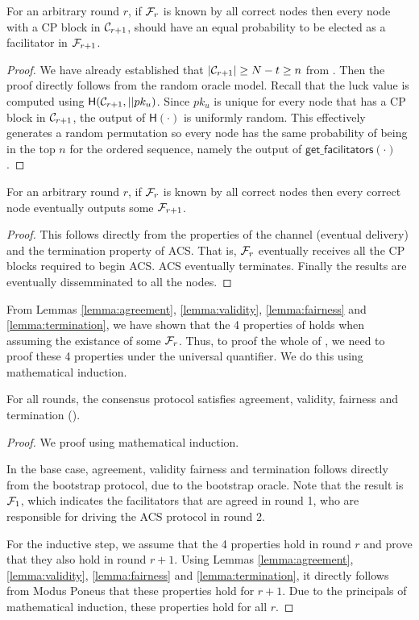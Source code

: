 \begin{lemma}
\label{lemma:fairness}
For an arbitrary round $r$,
if $\mathcal{F}_r$ is known by all correct nodes then
every node with a CP block in $\mathcal{C}_{r+1}$, should have an equal probability to be elected as a facilitator in $\mathcal{F}_{r+1}$.
\end{lemma}
\begin{proof}
We have already established that $|\mathcal{C}_{r+1}| \ge N - t \ge n$ from .
Then the proof directly follows from the random oracle model.
Recall that the luck value is computed using $\textsf{H}(\mathcal{C}_{r+1}, || pk_u)$.
Since $pk_u$ is unique for every node that has a CP block in $\mathcal{C}_{r+1}$,
the output of $\textsf{H}(\cdot)$ is uniformly random.
This effectively generates a random permutation
so every node has the same probability of being in the top $n$ for the ordered sequence,
namely the output of $\textsf{get\_facilitators}(\cdot)$.
\end{proof}

\begin{lemma}
\label{lemma:termination}
For an arbitrary round $r$,
if $\mathcal{F}_r$ is known by all correct nodes then
every correct node eventually outputs some $\mathcal{F}_{r + 1}$.
\end{lemma}
\begin{proof}
This follows directly from the properties of the channel (eventual delivery)
and the termination property of ACS.
That is, $\mathcal{F}_r$ eventually receives all the CP blocks required to begin ACS.
ACS eventually terminates.
Finally the results are eventually dissemminated to all the nodes.
\end{proof}

From Lemmas \ref{lemma:agreement}, \ref{lemma:validity}, \ref{lemma:fairness} and \ref{lemma:termination},
we have shown that the 4 properties of  holds when assuming the existance of some $\mathcal{F}_r$.
Thus, to proof the whole of ,
we need to proof these 4 properties under the universal quantifier.
We do this using mathematical induction.

\begin{theorem}
\label{theorem:consensus}
For all rounds,
the consensus protocol satisfies agreement, validity, fairness and termination ().
\end{theorem}
\begin{proof}
We proof using mathematical induction.

In the base case, agreement, validity fairness and termination follows directly from the bootstrap protocol,
due to the bootstrap oracle.
Note that the result is $\mathcal{F}_1$, which indicates the facilitators that are agreed in round 1, who are responsible for driving the ACS protocol in round 2.

For the inductive step,
we assume that the 4 properties hold in round $r$ and prove that they also hold in round $r + 1$.
Using Lemmas \ref{lemma:agreement}, \ref{lemma:validity}, \ref{lemma:fairness} and \ref{lemma:termination},
it directly follows from Modus Poneus that these properties hold for $r + 1$.
Due to the principals of mathematical induction, these properties hold for all $r$.
\end{proof}


